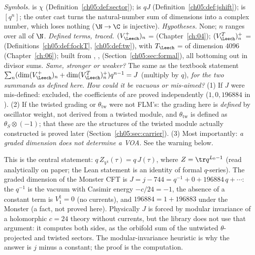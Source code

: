 \begin{dictionary}[title={Fidelity check for the main theorem}]
\emph{Symbols.}  is $\chi$ (Definition~\ref{ch05:def:sector});  is $qJ$
(Definition~\ref{ch05:def:jshift});  is $[q^n]$; the outer cast  turns
the natural-number sum of dimensions into a complex number, which loses nothing ($\N\to\C$ is
injective). \emph{Hypotheses.} None; $n$ ranges over all of $\N$. \emph{Defined terms, traced.}
$(V_\Leech^+)_n$ =  (Chapter~\ref{ch:04}); $(V_\Leech^T)^+_n$ =
 (Definitions~\ref{ch05:def:fockT}, \ref{ch05:def:tw}),
with $T_\Leech$ =  of dimension $4096$ (Chapter~\ref{ch:06});  built from
, ,  (Section~\ref{ch05:sec:formal}), all bottoming
out in divisor sums. \emph{Same, stronger or weaker?} The same as the textbook statement
$\sum_n(\dim(V_\Leech^+)_n + \dim(V_\Leech^T)^+_n)q^{n-1} = J$ (multiply by $q$), \emph{for the two summands
as defined here}. \emph{How could it be vacuous or mis-aimed?}
(1) If $J$ were mis-defined: excluded, the coefficients of  are proved independently
($1, 0, 196884$ in ). (2) If the twisted grading or $\theta_{\mathrm{tw}}$ were not
FLM's: the grading here is \emph{defined} by oscillator weight, not derived from a twisted module, and
$\theta_{\mathrm{tw}}$ is defined as $\theta_S\otimes(-1)$; that these are the structures of the twisted module
actually constructed is proved later (Section~\ref{ch05:sec:carrier}). (3) Most importantly: \emph{a
graded dimension does not determine a VOA.} See the warning below.
\end{dictionary}

\begin{physics}
This is the central statement: $q\,Z_{V^\natural}(\tau)=q\,J(\tau)$, where $Z=\tr q^{L_0-1}$ (read
analytically on paper; the Lean statement is an identity of formal $q$-series). The graded dimension of the Monster CFT is $J=j-744=q^{-1}+0+196884\,q+\cdots$: the $q^{-1}$ is the vacuum with Casimir energy $-c/24=-1$, the absence of a constant term is $V^\natural_1=0$ (no currents), and $196884=1+196883$ under the Monster (a fact, not proved here). Physically $J$ is forced by modular invariance of a holomorphic $c=24$ theory without currents, but the library does not use that argument: it computes both sides, as the orbifold sum of the untwisted $\theta$-projected and twisted sectors. The modular-invariance heuristic is why the answer is $j$ minus a constant; the proof is the computation.
\end{physics}

